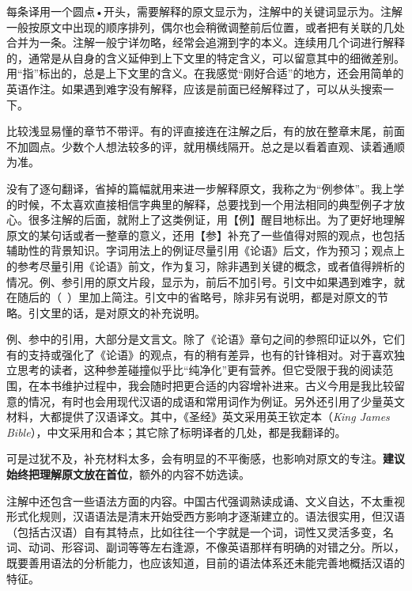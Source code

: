 每条译用一个圆点•开头，需要解释的原文显示为，注解中的关键词显示为。注解一般按原文中出现的顺序排列，偶尔也会稍微调整前后位置，或者把有关联的几处合并为一条。注解一般宁详勿略，经常会追溯到字的本义。连续用几个词进行解释的，通常是从自身的含义延伸到上下文里的特定含义，可以留意其中的细微差别。用“指”标出的，总是上下文里的含义。在我感觉“刚好合适”的地方，还会用简单的英语作注。如果遇到难字没有解释，应该是前面已经解释过了，可以从头搜索一下。

比较浅显易懂的章节不带评。有的评直接连在注解之后，有的放在整章末尾，前面不加圆点。少数个人想法较多的评，就用横线隔开。总之是以看着直观、读着通顺为准。

没有了逐句翻译，省掉的篇幅就用来进一步解释原文，我称之为“例参体”。我上学的时候，不太喜欢直接相信字典里的解释，总要找到一个用法相同的典型例子才放心。很多注解的后面，就附上了这类例证，用【例】醒目地标出。为了更好地理解原文的某句话或者一整章的意义，还用【参】补充了一些值得对照的观点，也包括辅助性的背景知识。字词用法上的例证尽量引用《论语》后文，作为预习；观点上的参考尽量引用《论语》前文，作为复习，除非遇到关键的概念，或者值得辨析的情况。例、参引用的原文片段，显示为，前后不加引号。引文中如果遇到难字，就在随后的（~）里加上简注。引文中的省略号，除非另有说明，都是对原文的节略。引文里的话，是对原文的补充说明。

例、参中的引用，大部分是文言文。除了《论语》章句之间的参照印证以外，它们有的支持或强化了《论语》的观点，有的稍有差异，也有的针锋相对。对于喜欢独立思考的读者，这种参差碰撞似乎比“纯净化”更有营养。但它受限于我的阅读范围，在本书维护过程中，我会随时把更合适的内容增补进来。古义今用是我比较留意的情况，有时也会用现代汉语的成语和常用词作为例证。另外还引用了少量英文材料，大都提供了汉语译文。其中，《圣经》英文采用英王钦定本（\emph{King James Bible}），中文采用和合本；其它除了标明译者的几处，都是我翻译的。

可是过犹不及，补充材料太多，会有明显的不平衡感，也影响对原文的专注。\textbf{建议始终把理解原文放在首位}，额外的内容不妨选读。

注解中还包含一些语法方面的内容。中国古代强调熟读成诵、文义自达，不太重视形式化规则，汉语语法是清末开始受西方影响才逐渐建立的。语法很实用，但汉语（包括古汉语）自有其特点，比如往往一个字就是一个词，词性又灵活多变，名词、动词、形容词、副词等等左右逢源，不像英语那样有明确的对错之分。所以，既要善用语法的分析能力，也应该知道，目前的语法体系还未能完善地概括汉语的特征。

